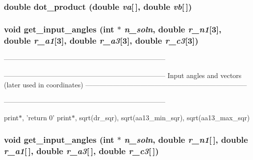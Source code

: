 \subsubsection{\setlength{\rightskip}{0pt plus 5cm}double dot\_\-product (double {\em va}[$\,$], double {\em vb}[$\,$])}\label{PTripepClosure_8h_d168c6bd6e9220010743327b140fae26}


\subsubsection{\setlength{\rightskip}{0pt plus 5cm}void get\_\-input\_\-angles (int $\ast$ {\em n\_\-soln}, double {\em r\_\-n1}[3], double {\em r\_\-a1}[3], double {\em r\_\-a3}[3], double {\em r\_\-c3}[3])}\label{PTripepClosure_8h_4e7f0982e1205e03439e0801f493a198}


----------------------------------------------------------------------- 



----------------------------------------------------------------------- Input angles and vectors (later used in coordinates) -----------------------------------------------------------------------

-----------------------------------------------------------------------

print$\ast$, 'return 0' print$\ast$, sqrt(dr\_\-sqr), sqrt(aa13\_\-min\_\-sqr), sqrt(aa13\_\-max\_\-sqr) 
\subsubsection{\setlength{\rightskip}{0pt plus 5cm}void get\_\-input\_\-angles (int $\ast$ {\em n\_\-soln}, double {\em r\_\-n1}[$\,$], double {\em r\_\-a1}[$\,$], double {\em r\_\-a3}[$\,$], double {\em r\_\-c3}[$\,$])}\label{PTripepClosure_8h_393b38594b0a27b92779acc32f39a62d}


